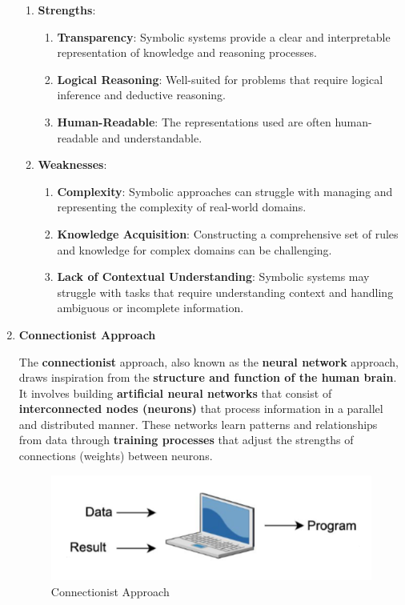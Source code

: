\begin{enumerate}
\begin{enumerate}
    \item \textbf{Strengths}:
        \begin{enumerate}
        \item \textbf{Transparency}: Symbolic systems provide a clear and interpretable representation of knowledge and reasoning processes.
        \item \textbf{Logical Reasoning}: Well-suited for problems that require logical inference and deductive reasoning.
        \item \textbf{Human-Readable}: The representations used are often human-readable and understandable.
    \end{enumerate}
    \item \textbf{Weaknesses}:
            \begin{enumerate}
        \item \textbf{Complexity}: Symbolic approaches can struggle with managing and representing the complexity of real-world domains.
        \item \textbf{Knowledge Acquisition}: Constructing a comprehensive set of rules and knowledge for complex domains can be challenging.
        \item \textbf{Lack of Contextual Understanding}: Symbolic systems may struggle with tasks that require understanding context and handling ambiguous or incomplete information.
    \end{enumerate}
\end{enumerate}
    \item \textbf{Connectionist Approach}
\begin{definition}
The \textbf{connectionist} approach, also known as the \textbf{neural network} approach, draws inspiration from the \textbf{structure and function of the human brain}. It involves building \textbf{artificial neural networks} that consist of \textbf{interconnected nodes (neurons)} that process information in a parallel and distributed manner. These networks learn patterns and relationships from data through \textbf{training processes} that adjust the strengths of connections (weights) between neurons.
\end{definition}
\begin{figure}[h!t]
    \centering
    \includegraphics[width=0.5\linewidth]{connectionist.png}
    \caption{Connectionist Approach}
    

\end{figure}
\end{enumerate}
